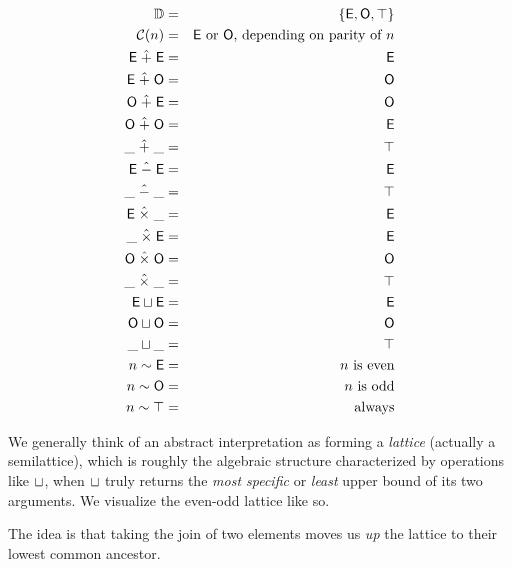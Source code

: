 \documentclass{amsbook}
\theoremstyle{definition}
\theoremstyle{remark}
\numberwithin{section}{chapter}
\numberwithin{equation}{chapter}
\begin{document}
\newcommand{\E}[0]{\mathsf{E}}
\renewcommand{\O}[0]{\mathsf{O}}
\begin{eqnarray*}
  \mathbb D &=& \{\E, \O, \top\} \\
  \mathcal C(n) &=& \textrm{$\E$ or $\O$, depending on parity of $n$} \\
  \E \; \hat{+} \; \E &=& \E \\
  \E \; \hat{+} \; \O &=& \O \\
  \O \; \hat{+} \; \E &=& \O \\
  \O \; \hat{+} \; \O &=& \E \\
  \_ \; \hat{+} \; \_ &=& \top \\
  \E \; \hat{-} \; \E &=& \E \\
  \_ \; \hat{-} \; \_ &=& \top \\
  \E \; \hat{\times} \; \_ &=& \E \\
  \_ \; \hat{\times} \; \E &=& \E \\
  \O \; \hat{\times} \; \O &=& \O \\
  \_ \; \hat{\times} \; \_ &=& \top \\
  \E \join \E &=& \E \\
  \O \join \O &=& \O \\
  \_ \join \_ &=& \top \\
  n \sim \E &=& \textrm{$n$ is even} \\
  n \sim \O &=& \textrm{$n$ is odd} \\
  n \sim \top &=& \textrm{always}
\end{eqnarray*}

We generally think of an abstract interpretation as forming a \emph{lattice} (actually a semilattice), which is roughly the algebraic structure characterized by operations like $\sqcup$, when $\sqcup$ truly returns the \emph{most specific} or \emph{least} upper bound of its two arguments.  We visualize the even-odd lattice like so.

\begin{center}\end{center}

The idea is that taking the join of two elements moves us \emph{up} the lattice to their lowest common ancestor.
\end{document}

